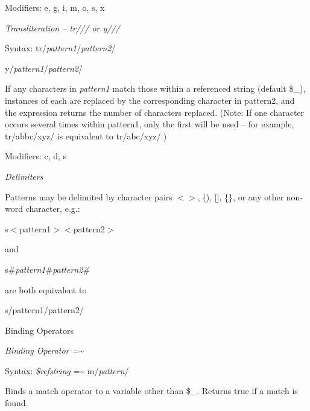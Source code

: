 \documentclass[a4paper,11pt]{book}
\begin{document}
\noindent 

\noindent Modifiers: e, g, i, m, o, s, x

\noindent 

\noindent \textit{Transliteration -- tr/// or y///}

\noindent Syntax: tr/\textit{pattern1}/\textit{pattern2}/

\noindent y/\textit{pattern1}/\textit{pattern2}/

\noindent 

\noindent If any characters in \textit{pattern1 }match those within a referenced string (default \$\_), instances of each are replaced by the corresponding character in pattern2, and the expression returns the number of characters replaced. (Note: If one character occurs several times within pattern1, only the first will be used -- for example, tr/abbc/xyz/ is equivalent to tr/abc/xyz/.)

\noindent 

\noindent Modifiers: c, d, s

\noindent \eject 

\noindent 

\noindent \textit{Delimiters}

\noindent Patterns may be delimited by character pairs $<$$>$,   (),   [],   \{\}, or any other non-word character, e.g.:

\noindent 

\noindent s$<$pattern1$>$$<$pattern2$>$

\noindent 

\noindent and

\noindent 

\noindent s\#\textit{pattern1}\#\textit{pattern2}\#

\noindent 

\noindent are both equivalent to

\noindent 

\noindent s/pattern1/pattern2/

\noindent 

\noindent Binding Operators

\noindent 

\noindent 

\noindent \textit{Binding Operator  =\~{}}

\noindent Syntax: \textit{\$refstring }=\~{} m/\textit{pattern}/

\noindent 

\noindent Binds a match operator to a variable other than \$\_. Returns true if a match is found.
\end{document}
